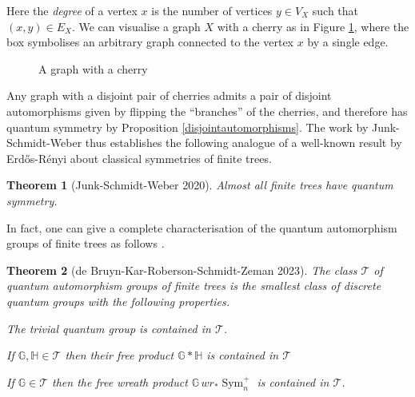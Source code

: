 \documentclass[a4paper]{amsart}
\newcommand*{\T}{\mathcal{T}}
\newcommand{\GG}{\mathbb{G}}
\newcommand{\HH}{\mathbb{H}}
\DeclareMathOperator{\Sym}{Sym}
\newenvironment{bnum}
{\begin{list}{}
    {\setlength{\labelwidth}{15pt}
     \setlength{\leftmargin}{\labelwidth}
    }
}
{\end{list}}
\numberwithin{equation}{section}
\theoremstyle{change}
\newtheorem{theorem}{Theorem}[section]
\begin{document}
Here the \emph{degree} of a vertex $ x $ is the number of vertices $ y \in V_X $ such that $ (x,y) \in E_X $. 
We can visualise a graph $ X $ with a cherry as in Figure \ref{cherry}, where the box symbolises an arbitrary graph connected to the vertex $ x $ by a single edge. 

\begin{figure}[ht]
\centering
{}
\caption{A graph with a cherry} \label{cherry}
\end{figure}

Any graph with a disjoint pair of cherries admits a pair of disjoint automorphisms given by flipping the ``branches'' of the cherries, and therefore has quantum symmetry by Proposition \ref{disjointautomorphisms}. The work by Junk-Schmidt-Weber thus establishes the following analogue of a well-known result by Erd\H{o}s-R\'enyi \cite{ERDOES_RENYI_asymmetricgraphs} about classical symmetries of finite trees.  

\begin{theorem}[Junk-Schmidt-Weber 2020]
Almost all finite trees have quantum symmetry. 
\end{theorem}

In fact, one can give a complete characterisation of the quantum automorphism groups of finite trees as follows \cite{DEBRUYN_KAR_ROBERSON_SCHMIDT_ZEMAN_quantumautomorphismtrees}. 

\begin{theorem}[de Bruyn-Kar-Roberson-Schmidt-Zeman 2023] \label{trees}
The class $ \T $ of quantum automorphism groups of finite trees is the smallest class of discrete quantum groups 
with the following properties. 
\begin{bnum} 
\item[a)] The trivial quantum group is contained in $ \T $. 
\item[b)] If $ \GG, \HH \in \T $ then their free product $ \GG * \HH $ is contained in $ \T $
\item[c)] If $ \GG \in \T $ then the free wreath product $ \GG \,wr_* \Sym_n^+ $ is contained in $ \T $. 
\end{bnum} 
\end{theorem} 
\end{document}
